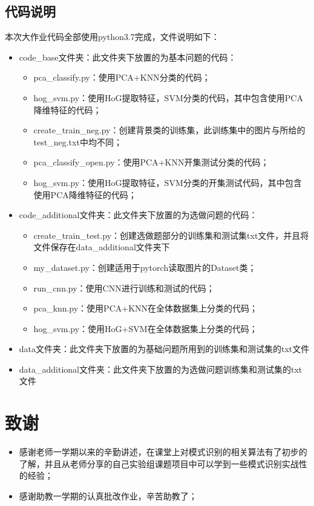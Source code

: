\documentclass[cn]{elegantbook}
\begin{document}
\section{代码说明}
本次大作业代码全部使用python3.7完成，文件说明如下：
\begin{itemize}
	\item code\_base文件夹：此文件夹下放置的为基本问题的代码：
	\begin{itemize}
		\item pca\_classify.py：使用PCA+KNN分类的代码；
		\item hog\_svm.py：使用HoG提取特征，SVM分类的代码，其中包含使用PCA降维特征的代码；
		\item create\_train\_neg.py：创建背景类的训练集，此训练集中的图片与所给的test\_neg.txt中均不同；
		\item pca\_classify\_open.py：使用PCA+KNN开集测试分类的代码；
		\item hog\_svm.py：使用HoG提取特征，SVM分类的开集测试代码，其中包含使用PCA降维特征的代码；
	\end{itemize}
	\item code\_additional文件夹：此文件夹下放置的为选做问题的代码：
	\begin{itemize}
		\item create\_train\_test.py：创建选做题部分的训练集和测试集txt文件，并且将文件保存在data\_additional文件夹下
		\item my\_dataset.py：创建适用于pytorch读取图片的Dataset类；
		\item run\_cnn.py：使用CNN进行训练和测试的代码；
		\item pca\_knn.py：使用PCA+KNN在全体数据集上分类的代码；
		\item hog\_svm.py：使用HoG+SVM在全体数据集上分类的代码；
	\end{itemize}
	\item data文件夹：此文件夹下放置的为基础问题所用到的训练集和测试集的txt文件
	\item data\_additional文件夹：此文件夹下放置的为选做问题训练集和测试集的txt文件
\end{itemize}

\chapter{致谢}
\begin{itemize}
	\item 感谢老师一学期以来的辛勤讲述，在课堂上对模式识别的相关算法有了初步的了解，并且从老师分享的自己实验组课题项目中可以学到一些模式识别实战性的经验；
	\item 感谢助教一学期的认真批改作业，辛苦助教了；
\end{itemize}
\end{document}
